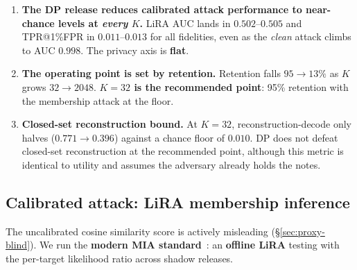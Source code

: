 \documentclass[conference]{IEEEtran}
\theoremstyle{remark}
\newcommand{\secref}[1]{\S\ref{#1}}
\begin{document}
\begin{enumerate}
  \item \textbf{The DP release reduces calibrated attack performance to near-chance levels at \emph{every} $K$.} LiRA AUC lands in $0.502$--$0.505$ and TPR@1\%FPR in $0.011$--$0.013$ for all fidelities, even as the \emph{clean} attack climbs to AUC $0.998$. The privacy axis is \textbf{flat}.
  \item \textbf{The operating point is set by retention.} Retention falls $95 \to 13\%$ as $K$ grows $32 \to 2048$. \textbf{$K = 32$ is the recommended point}: 95\% retention with the membership attack at the floor.
  \item \textbf{Closed-set reconstruction bound.} At $K = 32$, reconstruction-decode only halves ($0.771 \to 0.396$) against a chance floor of $0.010$. DP does not defeat closed-set reconstruction at the recommended point, although this metric is identical to utility and assumes the adversary already holds the notes.
\end{enumerate}

\subsection{Calibrated attack: LiRA membership inference}\label{sec:lira}

The uncalibrated cosine similarity score is actively misleading (\secref{sec:proxy-blind}). We run the \textbf{modern MIA standard}~\cite{carlini2022lira}: an \textbf{offline LiRA} testing with the per-target likelihood ratio across shadow releases.
\end{document}
